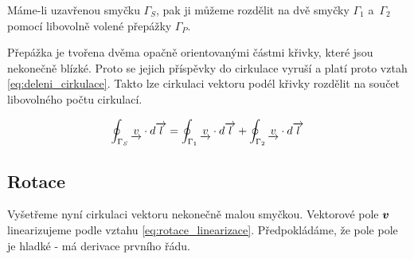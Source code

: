 Máme-li uzavřenou smyčku \(\Gamma_S\), pak ji můžeme rozdělit na dvě smyčky \(\Gamma_1\) a~\(\Gamma_2\) pomocí libovolně volené přepážky \(\Gamma_P\).


Přepážka je tvořena dvěma opačně orientovanými částmi křivky, které jsou nekonečně blízké. Proto se jejich příspěvky do cirkulace vyruší a platí proto vztah \eqref{eq:deleni_cirkulace}. Takto lze cirkulaci vektoru podél křivky rozdělit na součet libovolného počtu cirkulací.

\begin{equation}
\label{eq:deleni_cirkulace}
\begin{split}
\oint_{\Gamma_S} \underrightarrow{v} \cdot d\overrightarrow{l} = \oint_{\Gamma_1} \underrightarrow{v} \cdot d\overrightarrow{l} + \oint_{\Gamma_2} \underrightarrow{v} \cdot d\overrightarrow{l}
\end{split}
\end{equation}

\subsection{Rotace}
\label{sec:rotace}

Vyšetřeme nyní cirkulaci vektoru nekonečně malou smyčkou. Vektorové pole \(\boldsymbol{v}\) linearizujeme podle vztahu \eqref{eq:rotace_linearizace}.
Předpokládáme, že pole pole je hladké - má derivace prvního řádu.

